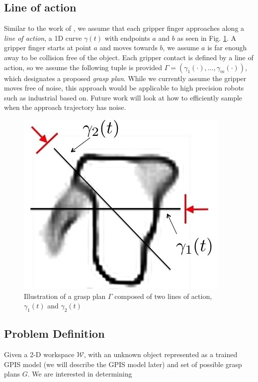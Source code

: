 \documentclass[letterpaper, 10 pt, conference]{ieeeconf}  %
\begin{document}
\subsection{Line of action}
Similar to the work of \cite{christopoulos2007handling}, we assume that each gripper finger approaches along a \textit{line of action}, a 1D curve $\gamma(t)$ with endpoints $a$ and $b$ as seen in Fig. \ref{fig:line_of_action}.
A gripper finger starts at point $a$ and moves towards $b$, we assume $a$ is far enough away to be collision free of the object.
Each gripper contact is defined by a line of action, so we assume the following tuple is provided $\Gamma = ( \gamma_1(\cdot),...,\gamma_m(\cdot) )$, which designates a proposed \textit{grasp plan}.
While we currently assume the gripper moves free of noise, this approach would be applicable to high precision robots such as industrial based on. 
Future work will look at how to efficiently sample when the approach trajectory has noise. 

\begin{figure}[ht!]
\centering
\includegraphics[scale = 0.3]{figures/Slide01.jpg}
\caption{Illustration of a grasp plan $\Gamma$ composed of two lines of action, $\gamma_1(t)$ and $\gamma_2(t)$}
\vspace*{-10pt}
\label{fig:line_of_action}
\end{figure}

\subsection{Problem Definition}

Given a 2-D workspace $\mathcal{W}$, with an unknown object represented as a trained GPIS model (we will describe the GPIS model later) and set of possible grasp plans $G$.
We are interested in determining 
\end{document}
